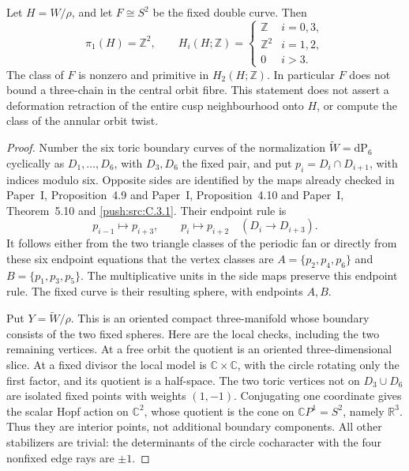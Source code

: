 \begin{proposition}\label{push:src:C.3.7}
Let \(H=W/\rho\), and let \(F\cong S^2\) be the fixed double
curve. Then
\[
 \pi_1(H)=\mathbb Z^2,\qquad
 H_i(H;\mathbb Z)=
 \begin{cases}
 \mathbb Z&i=0,3,\\
 \mathbb Z^2&i=1,2,\\
 0&i>3.
 \end{cases}
\]
The class of \(F\) is nonzero and primitive in \(H_2(H;\mathbb Z)\).
In particular \(F\) does not bound a three-chain in the central
orbit fibre. This statement does not assert a deformation retraction
of the entire cusp neighbourhood onto \(H\), or compute the class
of the annular orbit twist.
\end{proposition}
\begin{proof}
Number the six toric boundary curves of the normalization
\(\widetilde W=\mathrm{dP}_6\) cyclically as
\(D_1,\ldots,D_6\), with \(D_3,D_6\) the fixed pair, and put
\(p_i=D_i\cap D_{i+1}\), with indices modulo six. Opposite sides
are identified by the maps already checked in Paper~I, Proposition~4.9 and Paper~I, Proposition~4.10 and Paper~I, Theorem~5.10 and \ref{push:src:C.3.1}.
Their endpoint rule is
\[
 p_{i-1}\longmapsto p_{i+3},\qquad
 p_i\longmapsto p_{i+2}\quad(D_i\longrightarrow D_{i+3}).
\]
It follows either from the two triangle classes of the periodic
fan or directly from these six endpoint equations that the vertex
classes are
\(A=\{p_2,p_4,p_6\}\) and \(B=\{p_1,p_3,p_5\}\).
The multiplicative units in the side maps preserve this endpoint
rule. The fixed curve is their resulting sphere, with endpoints
\(A,B\).

Put \(Y=\widetilde W/\rho\). This is an oriented compact
three-manifold whose boundary consists of the two fixed spheres.
Here are the local checks, including the two remaining vertices.
At a free orbit the quotient is an oriented three-dimensional
slice. At a fixed divisor the local model is
\(\mathbb C\times\mathbb C\), with the circle rotating only
the first factor, and its quotient is a half-space. The two toric
vertices not on \(D_3\cup D_6\) are isolated fixed points with
weights \((1,-1)\). Conjugating one coordinate gives the scalar
Hopf action on \(\mathbb C^2\), whose quotient is the cone on
\(\mathbb CP^1=S^2\), namely \(\mathbb R^3\). Thus they are
interior points, not additional boundary components.
All other stabilizers are trivial: the determinants of the circle
cocharacter with the four nonfixed edge rays are \(\pm1\).


\end{proof}
